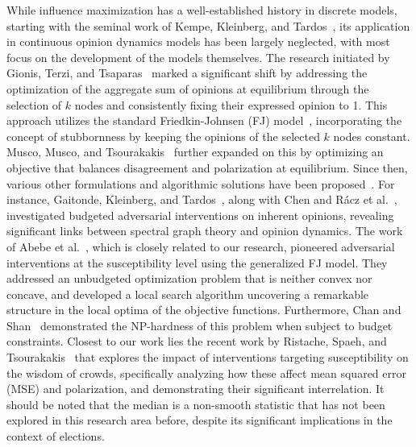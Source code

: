  While influence maximization has a well-established history in discrete models, starting with the seminal work of Kempe, Kleinberg, and Tardos~\cite{kempe2003maximizing}, its application in continuous opinion dynamics models has been largely neglected, with most focus on the development of the models themselves. The research initiated by Gionis, Terzi, and Tsaparas~\cite{gionis2013opinion} marked a significant shift by addressing the optimization of the aggregate sum of opinions at equilibrium through the selection of $k$ nodes and consistently fixing their expressed opinion to 1. This approach utilizes the standard Friedkin-Johnsen (FJ) model~\cite{friedkin1990social}, incorporating the concept of stubbornness by keeping the opinions of the selected $k$ nodes constant. 
Musco, Musco, and Tsourakakis~\cite{musco18} further expanded on this by optimizing an objective that balances disagreement and polarization at equilibrium.  Since then, various other formulations and algorithmic solutions have been proposed~\cite{biondi2023dynamics,zhu2022nearly,sun2023opinion,tang2021susceptible,zhu2021minimizing}.  For instance, Gaitonde, Kleinberg, and Tardos~\cite{gaitonde2020adversarial}, along with Chen and Rácz et al.~\cite{chen22,DBLP:journals/corr/abs-2206-08996}, investigated budgeted adversarial interventions on inherent opinions, revealing significant links between spectral graph theory and opinion dynamics. The work of Abebe et al.~\cite{abebe2020opinion}, which is closely related to our research, pioneered adversarial interventions at the susceptibility level using the generalized FJ model. They addressed an unbudgeted optimization problem that is neither convex nor concave, and developed a local search algorithm uncovering a remarkable structure in the local optima of the objective functions. Furthermore, Chan and Shan~\cite{chan2021hardness} demonstrated the NP-hardness of this problem when subject to budget constraints. Closest to our work lies the recent work by Ristache, Spaeh, and Tsourakakis~\cite{ristache2024wiser} that explores the impact of interventions targeting susceptibility on the wisdom of crowds, specifically analyzing how these affect mean squared error (MSE) and polarization, and demonstrating their significant interrelation. It should be noted that the median is a non-smooth statistic that has not been explored in this research area before, despite its significant implications in the context of elections.